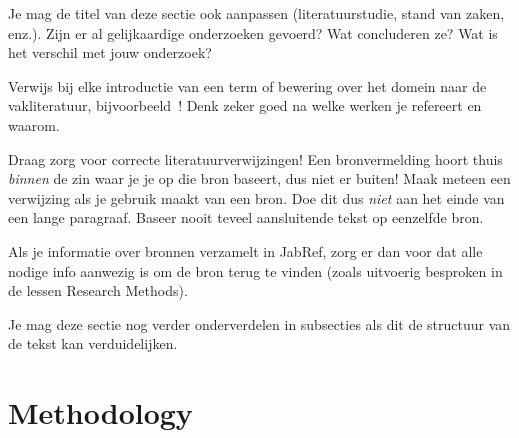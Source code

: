 Je mag de titel van deze sectie ook aanpassen (literatuurstudie, stand van zaken, enz.). Zijn er al gelijkaardige onderzoeken gevoerd? Wat concluderen ze? Wat is het verschil met jouw onderzoek?

Verwijs bij elke introductie van een term of bewering over het domein naar de vakliteratuur, bijvoorbeeld~\autocite{Hykes2013}! Denk zeker goed na welke werken je refereert en waarom.

Draag zorg voor correcte literatuurverwijzingen! Een bronvermelding hoort thuis \emph{binnen} de zin waar je je op die bron baseert, dus niet er buiten! Maak meteen een verwijzing als je gebruik maakt van een bron. Doe dit dus \emph{niet} aan het einde van een lange paragraaf. Baseer nooit teveel aansluitende tekst op eenzelfde bron.

Als je informatie over bronnen verzamelt in JabRef, zorg er dan voor dat alle nodige info aanwezig is om de bron terug te vinden (zoals uitvoerig besproken in de lessen Research Methods).


Je mag deze sectie nog verder onderverdelen in subsecties als dit de structuur van de tekst kan verduidelijken.

\section{Methodology}%
\label{sec:methodology}

